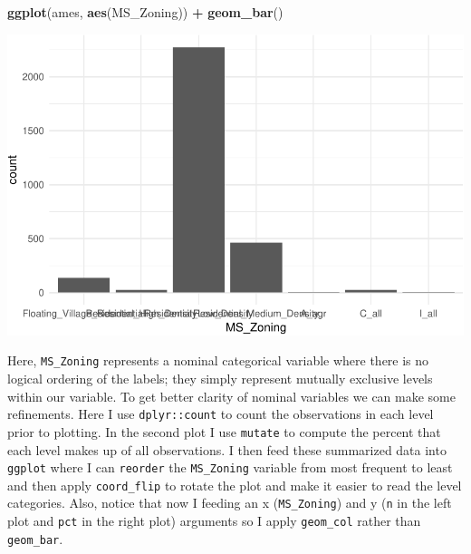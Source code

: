 \documentclass[]{article}
\newenvironment{Shaded}{\begin{snugshade}}{\end{snugshade}}
\newcommand{\KeywordTok}[1]{\textcolor[rgb]{0.13,0.29,0.53}{\textbf{#1}}}
\newcommand{\StringTok}[1]{\textcolor[rgb]{0.31,0.60,0.02}{#1}}
\newcommand{\OperatorTok}[1]{\textcolor[rgb]{0.81,0.36,0.00}{\textbf{#1}}}
\newcommand{\NormalTok}[1]{#1}
\begin{document}
\begin{Shaded}
\begin{Highlighting}[]
\KeywordTok{ggplot}\NormalTok{(ames, }\KeywordTok{aes}\NormalTok{(MS_Zoning)) }\OperatorTok{+}
\StringTok{  }\KeywordTok{geom_bar}\NormalTok{()}
\end{Highlighting}
\end{Shaded}

\begin{center}\includegraphics{Chapter_3_-_Visualization_files/figure-latex/bar1-1} \end{center}

Here, \texttt{MS\_Zoning} represents a nominal categorical variable
where there is no logical ordering of the labels; they simply represent
mutually exclusive levels within our variable. To get better clarity of
nominal variables we can make some refinements. Here I use
\texttt{dplyr::count} to count the observations in each level prior to
plotting. In the second plot I use \texttt{mutate} to compute the
percent that each level makes up of all observations. I then feed these
summarized data into \texttt{ggplot} where I can \texttt{reorder} the
\texttt{MS\_Zoning} variable from most frequent to least and then apply
\texttt{coord\_flip} to rotate the plot and make it easier to read the
level categories. Also, notice that now I feeding an x
(\texttt{MS\_Zoning}) and y (\texttt{n} in the left plot and
\texttt{pct} in the right plot) arguments so I apply \texttt{geom\_col}
rather than \texttt{geom\_bar}.
\end{document}
